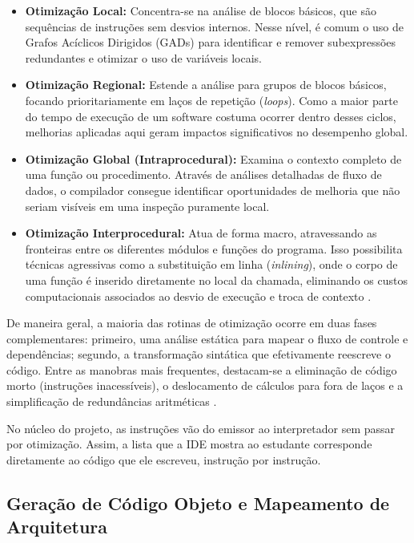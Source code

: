 \begin{itemize}
    \item \textbf{Otimização Local:} Concentra-se na análise de blocos básicos, que são sequências de instruções sem desvios internos. Nesse nível, é comum o uso de Grafos Acíclicos Dirigidos (GADs) para identificar e remover subexpressões redundantes e otimizar o uso de variáveis locais.
    
    \item \textbf{Otimização Regional:} Estende a análise para grupos de blocos básicos, focando prioritariamente em laços de repetição (\textit{loops}). Como a maior parte do tempo de execução de um software costuma ocorrer dentro desses ciclos, melhorias aplicadas aqui geram impactos significativos no desempenho global.
    
    \item \textbf{Otimização Global (Intraprocedural):} Examina o contexto completo de uma função ou procedimento. Através de análises detalhadas de fluxo de dados, o compilador consegue identificar oportunidades de melhoria que não seriam visíveis em uma inspeção puramente local.
    
    \item \textbf{Otimização Interprocedural:} Atua de forma macro, atravessando as fronteiras entre os diferentes módulos e funções do programa. Isso possibilita técnicas agressivas como a substituição em linha (\textit{inlining}), onde o corpo de uma função é inserido diretamente no local da chamada, eliminando os custos computacionais associados ao desvio de execução e troca de contexto \cite{cooper2012}.
\end{itemize}

De maneira geral, a maioria das rotinas de otimização ocorre em duas fases complementares: primeiro, uma análise estática para mapear o fluxo de controle e dependências; segundo, a transformação sintática que efetivamente reescreve o código. Entre as manobras mais frequentes, destacam-se a eliminação de código morto (instruções inacessíveis), o deslocamento de cálculos para fora de laços e a simplificação de redundâncias aritméticas \cite{aho1995}.

No núcleo do projeto, as instruções vão do emissor ao interpretador sem passar por otimização. Assim, a lista que a IDE mostra ao estudante corresponde diretamente ao código que ele escreveu, instrução por instrução.

\subsection{Geração de Código Objeto e Mapeamento de Arquitetura}

